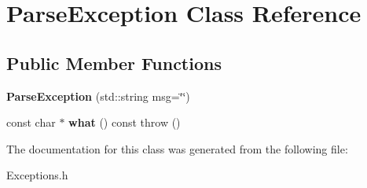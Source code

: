 \hypertarget{class_parse_exception}{\section{Parse\-Exception Class Reference}
\label{class_parse_exception}
}
\subsection*{Public Member Functions}
\begin{DoxyCompactItemize}
\item 
\hypertarget{class_parse_exception_ae42a372f3acb960331402fcca1808b52}{{\bfseries Parse\-Exception} (std\-::string msg=\char`\"{}\char`\"{})}\label{class_parse_exception_ae42a372f3acb960331402fcca1808b52}

\item 
\hypertarget{class_parse_exception_a3325238091196c8b7b48475734850f83}{const char $\ast$ {\bfseries what} () const   throw ()}\label{class_parse_exception_a3325238091196c8b7b48475734850f83}

\end{DoxyCompactItemize}


The documentation for this class was generated from the following file\-:\begin{DoxyCompactItemize}
\item 
Exceptions.\-h\end{DoxyCompactItemize}
